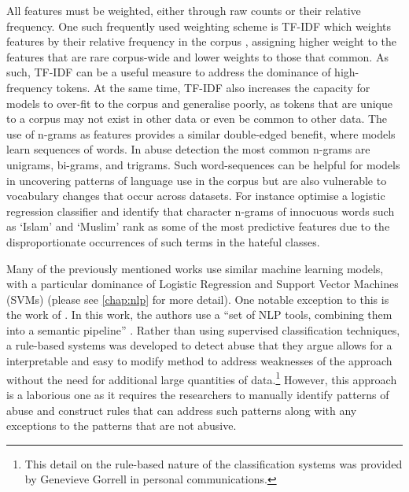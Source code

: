 
All features must be weighted, either through raw counts or their relative frequency.
One such frequently used weighting scheme is TF-IDF which weights features by their relative frequency in the corpus \citep{Fortuna:2018}, assigning higher weight to the features that are rare corpus-wide and lower weights to those that common.
As such, TF-IDF can be a useful measure to address the dominance of high-frequency tokens.
At the same time, TF-IDF also increases the capacity for models to over-fit to the corpus and generalise poorly, as tokens that are unique to a corpus may not exist in other data or even be common to other data.
The use of n-grams as features provides a similar double-edged benefit, where models learn sequences of words.
In abuse detection the most common n-grams are unigrams, bi-grams, and trigrams.
Such word-sequences can be helpful for models in uncovering patterns of language use in the corpus but are also vulnerable to vocabulary changes that occur across datasets.
For instance \citet{Waseem-Hovy:2016} optimise a logistic regression classifier and identify that character n-grams of innocuous words such as `Islam' and `Muslim' rank as some of the most predictive features due to the disproportionate occurrences of such terms in the hateful classes.

Many of the previously mentioned works use similar machine learning models, with a particular dominance of Logistic Regression and Support Vector Machines (SVMs) (please see \cref{chap:nlp} for more detail).
One notable exception to this is the work of \citet{Gorrell:2018}.
In this work, the authors use a ``set of NLP tools, combining them into a semantic pipeline'' \citep[pp. 601]{Gorrell:2018}.
Rather than using supervised classification techniques, a rule-based systems was developed to detect abuse that they argue allows for a interpretable and easy to modify method to address weaknesses of the approach without the need for additional large quantities of data.\footnote{This detail on the rule-based nature of the classification systems was provided by Genevieve Gorrell in personal communications.}
However, this approach is a laborious one as it requires the researchers to manually identify patterns of abuse and construct rules that can address such patterns along with any exceptions to the patterns that are not abusive.

